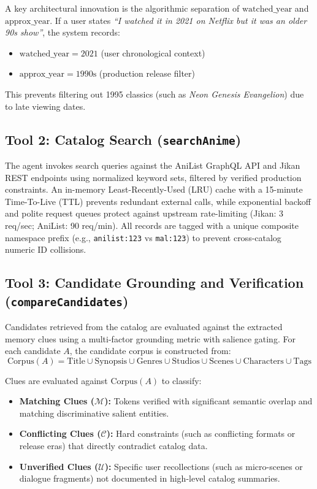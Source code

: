 \documentclass[11pt,a4paper]{article}
\begin{document}
A key architectural innovation is the algorithmic separation of $\text{watched\_year}$ and $\text{approx\_year}$. If a user states \textit{``I watched it in 2021 on Netflix but it was an older 90s show''}, the system records:
\begin{itemize}[noitemsep]
    \item $\text{watched\_year} = 2021$ (user chronological context)
    \item $\text{approx\_year} = 1990\text{s}$ (production release filter)
\end{itemize}
This prevents filtering out 1995 classics (such as \textit{Neon Genesis Evangelion}) due to late viewing dates.

\subsection{Tool 2: Catalog Search (\texttt{searchAnime})}
The agent invokes search queries against the AniList GraphQL API and Jikan REST endpoints using normalized keyword sets, filtered by verified production constraints. An in-memory Least-Recently-Used (LRU) cache with a 15-minute Time-To-Live (TTL) prevents redundant external calls, while exponential backoff and polite request queues protect against upstream rate-limiting (Jikan: 3 req/sec; AniList: 90 req/min). All records are tagged with a unique composite namespace prefix (e.g., \texttt{anilist:123} vs \texttt{mal:123}) to prevent cross-catalog numeric ID collisions.

\subsection{Tool 3: Candidate Grounding and Verification (\texttt{compareCandidates})}
Candidates retrieved from the catalog are evaluated against the extracted memory clues using a multi-factor grounding metric with salience gating. For each candidate $A$, the candidate corpus is constructed from:
\begin{equation}
\text{Corpus}(A) = \text{Title} \cup \text{Synopsis} \cup \text{Genres} \cup \text{Studios} \cup \text{Scenes} \cup \text{Characters} \cup \text{Tags}
\end{equation}

Clues are evaluated against $\text{Corpus}(A)$ to classify:
\begin{itemize}[noitemsep]
    \item \textbf{Matching Clues ($\mathcal{M}$):} Tokens verified with significant semantic overlap and matching discriminative salient entities.
    \item \textbf{Conflicting Clues ($\mathcal{C}$):} Hard constraints (such as conflicting formats or release eras) that directly contradict catalog data.
    \item \textbf{Unverified Clues ($\mathcal{U}$):} Specific user recollections (such as micro-scenes or dialogue fragments) not documented in high-level catalog summaries.
\end{itemize}
\end{document}
